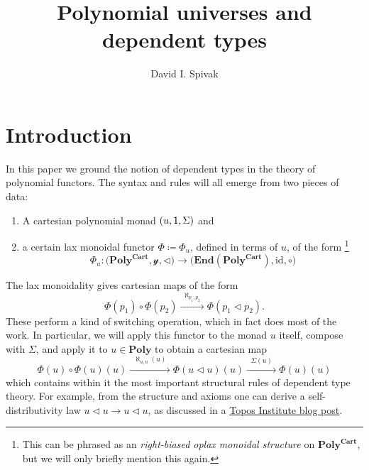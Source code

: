 \documentclass[11pt, one side, article]{memoir}
\theoremstyle{definition}
\theoremstyle{plain}
\newcommand{\Cat}[1]{\mathbf{#1}}%
\newcommand{\id}{\mathrm{id}}
\newcommand{\too}{\longrightarrow}
\newcommand{\Too}[1]{\xrightarrow{\;\;#1\;\;}}
\newcommand{\en}{\Cat{End}}
\newcommand{\yon}{\mathcal{y}}
\newcommand{\poly}{\Cat{Poly}}
\newcommand{\polycart}{\poly^{\Cat{Cart}}}
\newcommand{\0}{\textsf{0}}
\newcommand{\1}{\tn{\textsf{1}}}
\newcommand{\tri}{\mathbin{\triangleleft}}
\begin{document}
\title{Polynomial universes and dependent types}

\author{David I. Spivak}

\date{\vspace{-.2in}}

\maketitle

\begin{abstract}
\end{abstract}


\chapter{Introduction}

In this paper we ground the notion of dependent types in the theory of polynomial functors. The syntax and rules will all emerge from two pieces of data:
\begin{enumerate}
	\item A cartesian polynomial monad $(u,\1,\Sigma)$ and
	\item a certain lax monoidal functor $\Phi\coloneqq\Phi_u$, defined in terms of $u$, of the form%
\footnote{This can be phrased as an \emph{right-biased oplax monoidal structure} \cite{nlab.lax_monoidal} on $\polycart$, but we will only briefly mention this again.}
\[
\Phi_u\colon\Big(\polycart,\yon,\tri\Big)\too\Big(\en(\polycart),\id,\circ\Big)
\]
\end{enumerate}
The lax monoidality gives cartesian maps of the form 
\[
\Phi(p_1)\circ\Phi(p_2)
\Too{\aleph_{p_1,p_2}}
\Phi(p_1\tri p_2).
\]
These perform a kind of switching operation, which in fact does most of the work. In particular, we will apply this functor to the monad $u$ itself, compose with $\Sigma$, and apply it to $u\in\poly$ to obtain a cartesian map
\begin{equation}\label{eqn.main}
\Phi(u)\circ\Phi(u)(u)
\Too{\aleph_{u,u}(u)}
\Phi(u\tri u)(u)
\Too{\Sigma(u)}
\Phi(u)(u)
\end{equation}
which contains within it the most important structural rules of dependent type theory. For example, from the structure and axioms one can derive a self-distributivity law $u\tri u\to u\tri u$, as discussed in a \href{https://topos.site/blog/2021/07/jump-monads-from-conjugation-to-dependent-types/}{Topos Institute blog post}.
\end{document}
